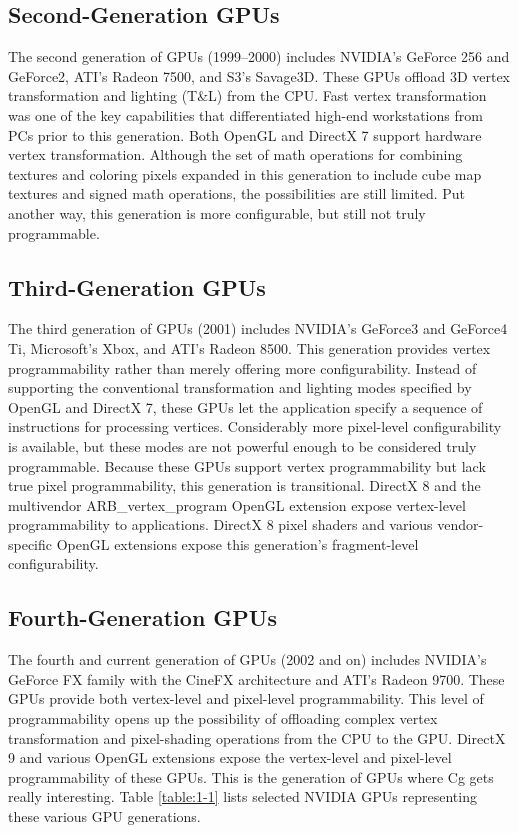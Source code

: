 \documentclass{book}
\begin{document}
\subsection*{Second-Generation GPUs}

The second generation of GPUs (1999–2000) includes NVIDIA's GeForce 256 and GeForce2, ATI's Radeon 7500, and S3's Savage3D. These GPUs offload 3D vertex transformation and lighting (T\&L) from the CPU. Fast vertex transformation was one of the key capabilities that differentiated high-end workstations from PCs prior to this generation. Both OpenGL and DirectX 7 support hardware vertex transformation. Although the set of math operations for combining textures and coloring pixels expanded in this generation to include cube map textures and signed math operations, the possibilities are still limited. Put another way, this generation is more configurable, but still not truly programmable.

\subsection*{Third-Generation GPUs}

The third generation of GPUs (2001) includes NVIDIA's GeForce3 and GeForce4 Ti, Microsoft's Xbox, and ATI's Radeon 8500. This generation provides vertex programmability rather than merely offering more configurability. Instead of supporting the conventional transformation and lighting modes specified by OpenGL and DirectX 7, these GPUs let the application specify a sequence of instructions for processing vertices. Considerably more pixel-level configurability is available, but these modes are not powerful enough to be considered truly programmable. Because these GPUs support vertex programmability but lack true pixel programmability, this generation is transitional. DirectX 8 and the multivendor ARB_vertex_program OpenGL extension expose vertex-level programmability to applications. DirectX 8 pixel shaders and various vendor-specific OpenGL extensions expose this generation's fragment-level configurability.

\subsection*{Fourth-Generation GPUs}

The fourth and current generation of GPUs (2002 and on) includes NVIDIA's GeForce FX family with the CineFX architecture and ATI's Radeon 9700. These GPUs provide both vertex-level and pixel-level programmability. This level of programmability opens up the possibility of offloading complex vertex transformation and pixel-shading operations from the CPU to the GPU. DirectX 9 and various OpenGL extensions expose the vertex-level and pixel-level programmability of these GPUs. This is the generation of GPUs where Cg gets really interesting. Table \ref{table:1-1} lists selected NVIDIA GPUs representing these various GPU generations.
\end{document}
